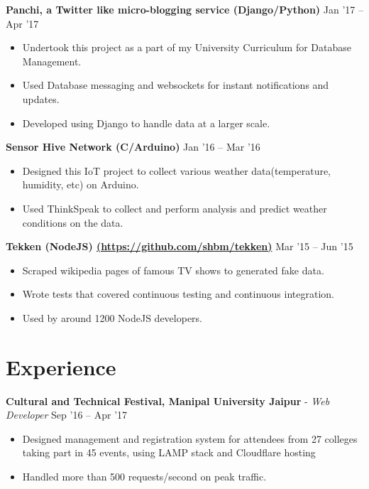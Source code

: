 \documentclass[letter]{res}
\begin{document}
\begin{resume}
\textbf{Panchi, a Twitter like micro-blogging service (Django/Python)}
\hfill Jan '17 – Apr '17\\
\begin{itemize}
  \vspace{-2mm}
 \item Undertook this project as a part of my University Curriculum for Database Management.
 \item Used Database messaging and websockets for instant notifications and updates.
 \item Developed using Django to handle data at a larger scale.
 \end{itemize}

\textbf{Sensor Hive Network (C/Arduino)}
\hfill Jan '16 – Mar '16\\
\begin{itemize}
  \vspace{-2mm}
 \item Designed this IoT project to collect various weather data(temperature, humidity, etc) on Arduino.
 \item Used ThinkSpeak to collect and perform analysis and predict weather conditions on the data.
 \end{itemize}

\textbf{Tekken (NodeJS) \url{(https://github.com/shbm/tekken)}
}\hfill Mar '15 – Jun '15\\
\begin{itemize}
  \vspace{-2mm}
 \item Scraped wikipedia pages of famous TV shows to generated fake data.
 \item Wrote tests that covered continuous testing and continuous integration.
 \item Used by around 1200 NodeJS developers.
 \end{itemize}


\section{Experience}
\textbf{Cultural and Technical Festival, Manipal University Jaipur}\newline
 - {\sl Web Developer} \hfill Sep '16 – Apr '17\\
 \vspace{-2mm}
 \begin{itemize}
 \item Designed management and registration system for attendees from 27 colleges taking part in 45 events, using LAMP stack and Cloudflare hosting
 \item Handled more than 500 requests/second on peak traffic.
 \end{itemize}


\end{resume}
\end{document}
